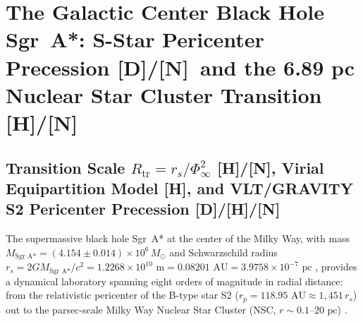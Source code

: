 \documentclass[11pt,a4paper]{article}
\newcommand{\catD}{\textbf{\textcolor{blue!75!black}{[D]}}}
\newcommand{\catH}{\textbf{\textcolor{orange!85!black}{[H]}}}
\newcommand{\catN}{\textbf{\textcolor{teal!75!black}{[N]}}}
\theoremstyle{plain}
\theoremstyle{definition}
\theoremstyle{remark}
\numberwithin{equation}{section}
\begin{document}
\section{\texorpdfstring{The Galactic Center Black Hole Sgr~A*: S-Star Pericenter Precession \catD/\catN\ and the 6.89 pc Nuclear Star Cluster Transition \catH/\catN}{The Galactic Center Black Hole Sgr A*: S-Star Pericenter Precession and the 6.89 pc Nuclear Star Cluster Transition}}

\subsection{\texorpdfstring{Transition Scale $R_{\text{tr}} = r_s/\Phi_{\infty}^2$ \catH/\catN, Virial Equipartition Model \catH, and VLT/GRAVITY S2 Pericenter Precession \catD/\catH/\catN}{Transition Scale, Virial Equipartition Model, and VLT/GRAVITY S2 Pericenter Precession}}

The supermassive black hole Sgr~A* at the center of the Milky Way, with mass $M_{\text{Sgr A*}} = (4.154 \pm 0.014) \times 10^6\,M_\odot$ and Schwarzschild radius $r_s = 2GM_{\text{Sgr A*}}/c^2 = 1.2268 \times 10^{10}\text{ m} = 0.08201\text{ AU} = 3.9758 \times 10^{-7}\text{ pc}$ \cite{gravity2018,gravity2020,eht2022}, provides a dynamical laboratory spanning eight orders of magnitude in radial distance: from the relativistic pericenter of the B-type star S2 ($r_p = 118.95\text{ AU} \approx 1{,}451\,r_s$) out to the parsec-scale Milky Way Nuclear Star Cluster (NSC, $r \sim 0.1\text{--}20\text{ pc}$) \cite{schodel2014,feldmeier2017}.
\end{document}
